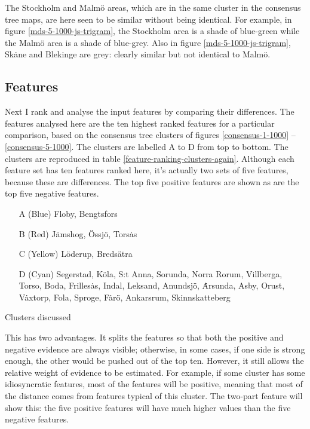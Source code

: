 The Stockholm and Malm\"o areas, which are in the same cluster in the
consensus tree maps, are here seen to be similar without being
identical. For example, in figure \ref{mds-5-1000-js-trigram}, the
Stockholm area is a shade of blue-green while the Malm\"o area is a
shade of blue-grey. Also in figure \ref{mds-5-1000-js-trigram},
Sk\.ane and Blekinge are grey: clearly similar but not identical to
Malm\"o.

\subsection{Features}


Next I rank and analyse the input features by comparing their
differences. The features analysed here are the ten highest ranked
features for a particular comparison, based on the consensus tree
clusters of figures \ref{consensus-1-1000} --
\ref{consensus-5-1000}. The clusters are labelled A to D from top to
bottom. The clusters are reproduced in table
\ref{feature-ranking-clusters-again}. Although each feature set has
ten features ranked here, it's actually two sets of five features,
because these are differences. The top five positive features are
shown as are the top five negative features.

\begin{table}
  \begin{enumerate}
   \item[A] (Blue) Floby, Bengtsfors
    \item[B] (Red) J\"amshog, \"Ossj\"o, Tors\.as
    \item[C] (Yellow) L\"oderup, Breds\"atra
    \item[D] (Cyan) Segerstad, K\"ola, S:t Anna, Sorunda, Norra Rorum,
      Villberga, Torso, Boda, Frilles\.as, Indal, Leksand, Anundsj\"o,
      \.Arsunda, Asby, Orust, V\.axtorp, Fola, Sproge, F\.ar\"o,
      Ankarsrum, Skinnskatteberg
  \end{enumerate}
  \caption{Clusters discussed}
  \label{feature-ranking-clusters-again}
\end{table}

This has two advantages. It splits the features so that both the
positive and negative evidence are always visible; otherwise, in some
cases, if one side is strong enough, the other would be pushed out of
the top ten. However, it still allows the relative weight of evidence
to be estimated. For example, if some cluster has some idiosyncratic
features, most of the features will be positive, meaning that most of
the distance comes from features typical of this cluster. The two-part
feature will show this: the five positive features will have much
higher values than the five negative features.

